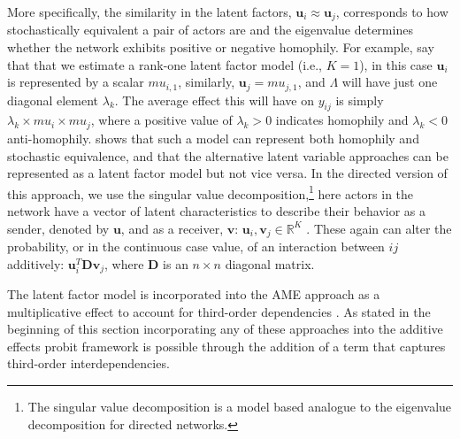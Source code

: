 More specifically, the similarity in the latent factors, $\bm u_{i} \approx \bm u_{j}$, corresponds to how stochastically equivalent a pair of actors are and the eigenvalue determines whether the network exhibits positive or negative homophily. For example, say that that we estimate a rank-one latent factor model (i.e., $K=1$), in this case $\bm u_{i}$ is represented by a scalar $mu_{i,1}$, similarly, $\bm u_{j}=mu_{j,1}$, and $\Lambda$ will have just one diagonal element $\lambda_{k}$. The average effect this will have on $y_{ij}$ is simply $\lambda_{k} \times mu_{i} \times mu_{j}$, where a positive value of $\lambda_{k}>0$ indicates homophily and $\lambda_{k}<0$ anti-homophily. \citet{hoff:2008} shows that such a model can represent both homophily and stochastic equivalence, and that the alternative latent variable approaches can be represented as a latent factor model but not vice versa. In the directed version of this approach, we use the singular value decomposition,\footnote{The singular value decomposition is a model based analogue to the eigenvalue decomposition for directed networks.} here actors in the network have a vector of latent characteristics to describe their behavior as a sender, denoted by $\bm u$, and as a receiver, $\textbf{v}$: $\bm u_{i}, \textbf{v}_{j} \in \mathbb{R}^{K}$ \citep{hoff:2009}. These again can alter the probability, or in the continuous case value, of an interaction between $ij$ additively: $\bm u_{i}^{T} \textbf{D} \textbf{v}_{j}$, where $\textbf{D}$ is an $n \times n$ diagonal matrix. 

The latent factor model is incorporated into the AME approach as a multiplicative effect to account for third-order dependencies \citep{hoff:2009,hoff:etal:2015}. As stated in the beginning of this section incorporating any of these approaches into the additive effects probit framework is possible through the addition of a term that captures third-order interdependencies. 

